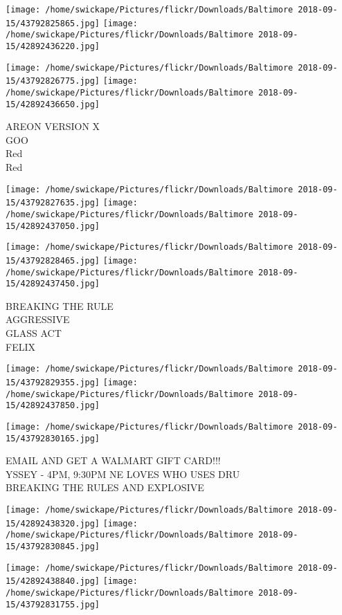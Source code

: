 \documentclass[10pt,letterpaper]{article}
\begin{document}
\texttt{[image: /home/swickape/Pictures/flickr/Downloads/Baltimore 2018-09-15/43792825865.jpg]}
\texttt{[image: /home/swickape/Pictures/flickr/Downloads/Baltimore 2018-09-15/42892436220.jpg]}

\texttt{[image: /home/swickape/Pictures/flickr/Downloads/Baltimore 2018-09-15/43792826775.jpg]}
\texttt{[image: /home/swickape/Pictures/flickr/Downloads/Baltimore 2018-09-15/42892436650.jpg]}

AREON VERSION X\\
GOO\\
Red\\
Red
\pagebreak

\texttt{[image: /home/swickape/Pictures/flickr/Downloads/Baltimore 2018-09-15/43792827635.jpg]}
\texttt{[image: /home/swickape/Pictures/flickr/Downloads/Baltimore 2018-09-15/42892437050.jpg]}

\texttt{[image: /home/swickape/Pictures/flickr/Downloads/Baltimore 2018-09-15/43792828465.jpg]}
\texttt{[image: /home/swickape/Pictures/flickr/Downloads/Baltimore 2018-09-15/42892437450.jpg]}

BREAKING THE RULE\\
AGGRESSIVE\\
GLASS ACT\\
FELIX
\pagebreak

\texttt{[image: /home/swickape/Pictures/flickr/Downloads/Baltimore 2018-09-15/43792829355.jpg]}
\texttt{[image: /home/swickape/Pictures/flickr/Downloads/Baltimore 2018-09-15/42892437850.jpg]}

\vspace{0.25in}
\texttt{[image: /home/swickape/Pictures/flickr/Downloads/Baltimore 2018-09-15/43792830165.jpg]}

EMAIL AND GET A WALMART GIFT CARD!!!\\
YSSEY {-} 4PM, 9:30PM NE LOVES WHO USES DRU\\
BREAKING THE RULES AND EXPLOSIVE
\pagebreak

\texttt{[image: /home/swickape/Pictures/flickr/Downloads/Baltimore 2018-09-15/42892438320.jpg]}
\texttt{[image: /home/swickape/Pictures/flickr/Downloads/Baltimore 2018-09-15/43792830845.jpg]}

\texttt{[image: /home/swickape/Pictures/flickr/Downloads/Baltimore 2018-09-15/42892438840.jpg]}
\texttt{[image: /home/swickape/Pictures/flickr/Downloads/Baltimore 2018-09-15/43792831755.jpg]}
\end{document}
